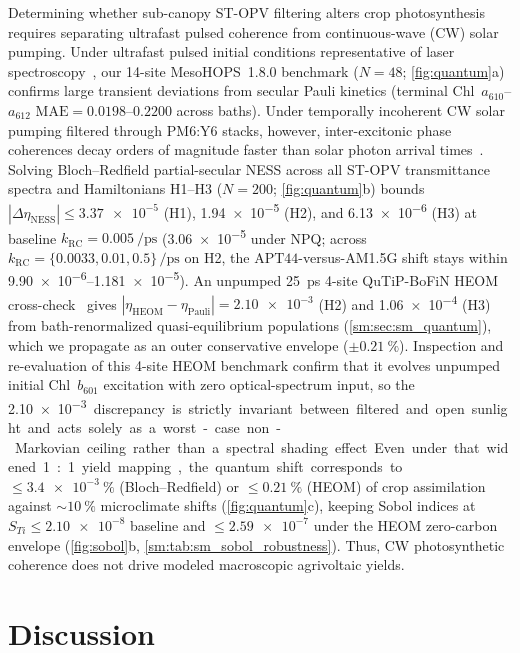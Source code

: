 \documentclass[preprint,12pt,a4paper]{elsarticle}
\begin{document}
Determining whether sub-canopy ST-OPV filtering alters crop photosynthesis requires separating ultrafast pulsed coherence from continuous-wave (CW) solar pumping. Under ultrafast pulsed initial conditions representative of laser spectroscopy~\cite{Rebentrost2009,TeguiaKouam2026}, our 14-site MesoHOPS~1.8.0 benchmark ($N = 48$; \cref{fig:quantum}a) confirms large transient deviations from secular Pauli kinetics (terminal Chl~$a_{610}$--$a_{612}$ $\mathrm{MAE} = \num{0.0198}$--$\num{0.2200}$ across baths). Under temporally incoherent CW solar pumping filtered through PM6:Y6 stacks, however, inter-excitonic phase coherences decay orders of magnitude faster than solar photon arrival times~\cite{BrumerShapiro2012,Kassal2013}. Solving Bloch--Redfield partial-secular NESS across all ST-OPV transmittance spectra and Hamiltonians H1--H3 ($N = \num{200}$; \cref{fig:quantum}b) bounds $|\Delta\eta_{\mathrm{NESS}}| \le \num{3.37e-5}$ (H1), \num{1.94e-5} (H2), and \num{6.13e-6} (H3) at baseline $k_{\mathrm{RC}} = \qty{0.005}{\per\pico\second}$ (\num{3.06e-5} under NPQ; across $k_{\mathrm{RC}}=\{\num{0.0033},\num{0.01},\num{0.5}\}\,\unit{\per\pico\second}$ on H2, the $\mathrm{APT44}$-versus-AM1.5G shift stays within \numrange{9.90e-6}{1.181e-5}). An unpumped \qty{25}{\pico\second} 4-site QuTiP-BoFiN HEOM cross-check~\cite{Lambert2023} gives $|\eta_{\mathrm{HEOM}}-\eta_{\mathrm{Pauli}}| = \num{2.10e-3}$ (H2) and \num{1.06e-4} (H3) from bath-renormalized quasi-equilibrium populations (\cref{sm:sec:sm_quantum}), which we propagate as an outer conservative envelope ($\pm \qty{0.21}{\percent}$). Inspection and re-evaluation of this 4-site HEOM benchmark confirm that it evolves unpumped initial Chl~$b_{601}$ excitation with zero optical-spectrum input, so the \qty{2.10e-3} discrepancy is strictly invariant between filtered and open sunlight and acts solely as a worst-case non-Markovian ceiling rather than a spectral shading effect. Even under that widened 1:1 yield mapping, the quantum shift corresponds to $\le \qty{3.4e-3}{\percent}$ (Bloch--Redfield) or $\le \qty{0.21}{\percent}$ (HEOM) of crop assimilation against $\sim\qty{10}{\percent}$ microclimate shifts (\cref{fig:quantum}c), keeping Sobol indices at $S_{Ti} \le \num{2.10e-8}$ baseline and $\le \num{2.59e-7}$ under the HEOM zero-carbon envelope (\cref{fig:sobol}b, \cref{sm:tab:sm_sobol_robustness}). Thus, CW photosynthetic coherence does not drive modeled macroscopic agrivoltaic yields.

\section{Discussion}
\label{sec:discussion}
\end{document}

